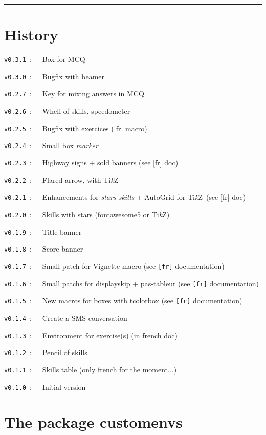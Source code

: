 \documentclass[english,11pt,a4paper]{article}
\providecommand\tikzlogo{Ti\textit{k}Z}
\let\TikZ\tikzlogo
\begin{document}
\hrule

\vfill

\section{History}

\verb|v0.3.1|~:~~~Box for MCQ

\verb|v0.3.0|~:~~~Bugfix with \textsf{beamer}

\verb|v0.2.7|~:~~~Key for mixing answers in MCQ

\verb|v0.2.6|~:~~~Whell of skills, speedometer

\verb|v0.2.5|~:~~~Bugfix with exercices (\textsf{[fr]} macro)

\verb|v0.2.4|~:~~~Small box \textit{marker}

\verb|v0.2.3|~:~~~Highway signs + sold banners (see \textsf{[fr]} doc)

\verb|v0.2.2|~:~~~Flared arrow, with \TikZ

\verb|v0.2.1|~:~~~Enhancements for \textit{stars skills} + AutoGrid for \TikZ\ (see \textsf{[fr]} doc)

\verb|v0.2.0|~:~~~Skills with stars (\textsf{fontawesome5} or \TikZ)

\verb|v0.1.9|~:~~~Title banner

\verb|v0.1.8|~:~~~Score banner

\verb|v0.1.7|~:~~~Small patch for \textsf{Vignette} macro (see \texttt{[fr]} documentation)

\verb|v0.1.6|~:~~~Small patchs for \textsf{displayskip} + \textsf{pas-tableur} (see \texttt{[fr]} documentation)

\verb|v0.1.5|~:~~~New macros for boxes with \textsf{tcolorbox} (see \texttt{[fr]} documentation)

\verb|v0.1.4|~:~~~Create a SMS conversation

\verb|v0.1.3|~:~~~Environment for exercise(s) (in french doc)

\verb|v0.1.2|~:~~~Pencil of skills

\verb|v0.1.1|~:~~~Skills table (only french for the moment...)

\verb|v0.1.0|~:~~~Initial version

\vspace*{5mm}

\pagebreak

\section{The package customenvs}
\end{document}
